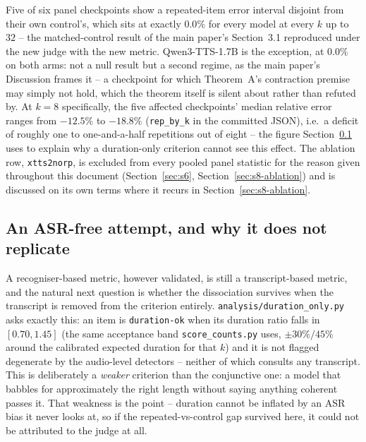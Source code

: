 \documentclass[11pt]{article}
\begin{document}
Five of six panel checkpoints show a repeated-item error interval disjoint
from their own control's, which sits at exactly $0.0\%$ for every model at
every $k$ up to $32$ -- the matched-control result of the main paper's
Section~3.1 reproduced under the new judge with the new metric. Qwen3-TTS-1.7B
is the exception, at $0.0\%$ on both arms: not a null result but a second
regime, as the main paper's Discussion frames it -- a checkpoint for which
Theorem~A's contraction premise may simply not hold, which the theorem
itself is silent about rather than refuted by. At $k{=}8$ specifically, the
five affected checkpoints' median relative error ranges from $-12.5\%$ to
$-18.8\%$ (\texttt{rep\_by\_k} in the committed JSON), i.e.\ a deficit of
roughly one to one-and-a-half repetitions out of eight -- the figure
Section~\ref{sec:s9-duration} uses to explain why a duration-only criterion
cannot see this effect. The ablation row, \texttt{xtts2norp}, is excluded
from every pooled panel statistic for the reason given throughout this
document (Section~\ref{sec:s6}, Section~\ref{sec:s8-ablation}) and is
discussed on its own terms where it recurs in Section~\ref{sec:s8-ablation}.

\subsection{An ASR-free attempt, and why it does not replicate}
\label{sec:s9-duration}

A recogniser-based metric, however validated, is still a transcript-based
metric, and the natural next question is whether the dissociation survives
when the transcript is removed from the criterion entirely.
\texttt{analysis/duration\_only.py} asks exactly this: an item is
\texttt{duration-ok} when its duration ratio falls in $[0.70, 1.45]$ (the
same acceptance band \texttt{score\_counts.py} uses, $\pm30\%/45\%$ around
the calibrated expected duration for that $k$) and it is not flagged
degenerate by the audio-level detectors -- neither of which consults any
transcript. This is deliberately a \emph{weaker} criterion than the
conjunctive one: a model that babbles for approximately the right length
without saying anything coherent passes it. That weakness is the point --
duration cannot be inflated by an ASR bias it never looks at, so if the
repeated-vs-control gap survived here, it could not be attributed to the
judge at all.
\end{document}
